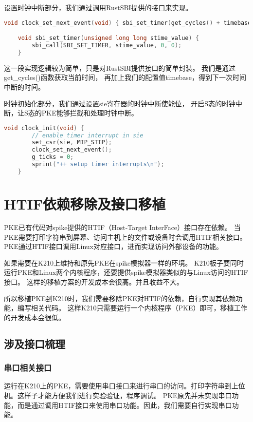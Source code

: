 设置时钟中断部分，我们通过调用RustSBI提供的接口来实现。

\begin{lstlisting}[caption={设置时钟中断}, label={lst:set_clock_interrupt}, language=C]
    void clock_set_next_event(void) { sbi_set_timer(get_cycles() + timebase); }

    void sbi_set_timer(unsigned long long stime_value) {
        sbi_call(SBI_SET_TIMER, stime_value, 0, 0);
    }  
\end{lstlisting}

这一段实现逻辑较为简单，只是对RustSBI提供接口的简单封装。
我们是通过get\_cycles()函数获取当前时间，
再加上我们的配置值timebase，得到下一次时间中断的时间。

时钟初始化部分，我们通过设置sie寄存器的时钟中断使能位，
开启S态的时钟中断，让S态的PKE能够拦截和处理时钟中断。

\begin{lstlisting}[caption={时钟初始化}, label={lst:clock_init}, language=C]
    void clock_init(void) {
        // enable timer interrupt in sie
        set_csr(sie, MIP_STIP);
        clock_set_next_event();
        g_ticks = 0;
        sprint("++ setup timer interrupts\n");
    }    
\end{lstlisting}

\section{HTIF依赖移除及接口移植}

PKE已有代码对spike提供的HTIF（Host-Target InterFace）接口存在依赖。
当PKE需要打印字符串到屏幕、访问主机上的文件或设备时会调用HTIF相关接口。
PKE通过HTIF接口调用Linux对应接口，进而实现访问外部设备的功能。

如果需要在K210上维持和原先PKE在spike模拟器一样的环境。
K210板子要同时运行PKE和Linux两个内核程序，还要提供spike模拟器类似的与Linux访问的HTIF接口。
这样的移植方案的开发成本会很高。并且收益不大。

所以移植PKE到K210时，我们需要移除PKE对HTIF的依赖，自行实现其依赖功能，编写相关代码。
这样K210只需要运行一个内核程序（PKE）即可，移植工作的开发成本会很低。

\subsection{涉及接口梳理}

\subsubsection{串口相关接口}
运行在K210上的PKE，需要使用串口接口来进行串口的访问。打印字符串到上位机。这样子才能方便我们进行实验验证，程序调试。
PKE原先并未实现串口功能，而是通过调用HTIF接口来使用串口功能。因此，我们需要自行实现串口功能。

